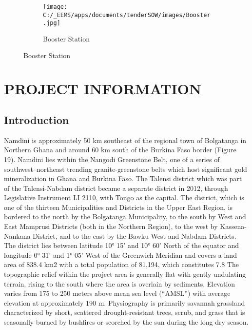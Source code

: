 \documentclass{article}%
\begin{document}
%


\begin{figure}[h!]%
\begin{subfigure}[b]{0.45\linewidth}%
\texttt{[image: C:/\_EEMS/apps/documents/tenderSOW/images/Booster.jpg]}%
\centering%
\caption{Booster Station}%
\end{subfigure}%
\end{figure}

%
\newpage%
\section{PROJECT INFORMATION}%
\label{sec:PROJECTINFORMATION}%
\subsection{Introduction}%
\label{subsec:Introduction}%
Namdini is approximately 50 km southeast of the regional town of Bolgatanga in Northern Ghana and around 60 km south of the Burkina Faso border (Figure 19). Namdini lies within the Nangodi Greenstone Belt, one of a series of southwest–northeast trending granite-greenstone belts which host significant gold mineralization in Ghana and Burkina Faso.
The Talensi district which was part of the Talensi-Nabdam district became a separate district in 2012, through Legislative Instrument LI 2110, with Tongo as the capital. The district, which is one of the thirteen Municipalities and Districts in the Upper East Region, is bordered to the north by the Bolgatanga Municipality, to the south by West and East Mamprusi Districts (both in the Northern Region), to the west by Kassena-Nankana District, and to the east by the Bawku West and Nabdam Districts. The district lies between latitude 10° 15' and 10° 60' North of the equator and longitude 0° 31' and 1° 05' West of the Greenwich Meridian and covers a land area of 838.4 km2 with a total population of 81,194, which constitutes 7.8%
The topographic relief within the project area is generally flat with gently undulating terrain, rising to the south where the area is overlain by sediments. Elevation varies from 175 to 250 meters above mean sea level (“AMSL”) with average elevation at approximately 190 m. Physiography is primarily savannah grassland characterized by short, scattered drought-resistant trees, scrub, and grass that is seasonally burned by bushfires or scorched by the sun during the long dry season.%
\end{document}
